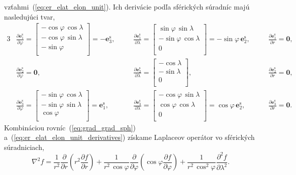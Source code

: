 \documentclass[a4paper, 12pt]{book}
\let\vec\mathbf
\begin{document}
vzťahmi~(\ref{eq:er_elat_elon_unit}).  Ich derivácie podľa sférických súradníc 
majú nasledujúci tvar,
%
\begin{alignat}{3}
&\frac{\partial \vec e_1^\mathrm{s}}{\partial \varphi} =
%
\begin{bmatrix}
-\cos\varphi \, \cos\lambda\\
-\cos\varphi \, \sin\lambda\\
-\sin\varphi\\
\end{bmatrix}
%
= -\vec e_3^\mathrm{s}
%
{,}\quad
%
&&\frac{\partial \vec e_1^\mathrm{s}}{\partial \lambda} =
%
\begin{bmatrix}
 \sin\varphi \, \sin\lambda\\
-\sin\varphi \, \cos\lambda\\
0\\
\end{bmatrix}
%
= -\sin\varphi \, \vec e_2^\mathrm{s}
%
{,}\quad
%
&&\frac{\partial \vec e_1^\mathrm{s}}{\partial r} = \vec 0{,}\nonumber\\
%
\label{eq:er_elat_elon_unit_derivatives}
&\frac{\partial \vec e_2^\mathrm{s}}{\partial \varphi} = \vec 0{,}
%
&&\frac{\partial \vec e_2^\mathrm{s}}{\partial \lambda} =
%
\begin{bmatrix}
-\cos\lambda\\
-\sin\lambda\\
0\\
\end{bmatrix}
%
{,}
%
&&\frac{\partial \vec e_2^\mathrm{s}}{\partial r} = \vec 0{,}\\
%
&\frac{\partial \vec e_3^\mathrm{s}}{\partial \varphi} =
%
\begin{bmatrix}
-\sin\varphi \, \cos\lambda\\
-\sin\varphi \, \sin\lambda\\
\cos\varphi\\
\end{bmatrix}
%
= \vec e_1^\mathrm{s}
%
{,}
%
&&\frac{\partial \vec e_3^\mathrm{s}}{\partial \lambda} =
%
\begin{bmatrix}
-\cos\varphi \, \sin\lambda\\
 \cos\varphi \, \cos\lambda\\
0\\
\end{bmatrix}
%
= \cos\varphi \, \vec e_2^\mathrm{s}
%
{,}
%
&&\frac{\partial \vec e_3^\mathrm{s}}{\partial r} = \vec 0{.}
\nonumber
\end{alignat}
%
Kombináciou rovníc~(\ref{eq:grad_grad_sph}) 
a~(\ref{eq:er_elat_elon_unit_derivatives}) získame Laplaceov operátor vo 
sférických súradniciach,
%
\begin{equation}
\label{eq:laplace_sph}
\nabla^2 f = \frac{1}{r^2} \frac{\partial}{\partial r} \left( r^2
\frac{\partial f}{\partial r} \right) + \frac{1}{r^2 \, \cos\varphi}
\frac{\partial}{\partial \varphi} \left( \cos\varphi \frac{\partial f}{\partial 
\varphi} \right) + \frac{1}{r^2 \,
\cos^2\varphi}\frac{\partial^2 f}{\partial \lambda^2}{.}
\end{equation}
\end{document}

